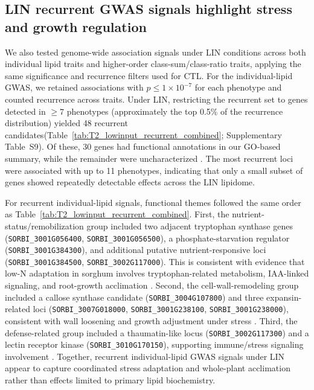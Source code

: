 \documentclass[9pt,twocolumn,twoside]{rilabRxiv}
\begin{document}
\subsection*{LIN recurrent GWAS signals highlight stress and growth regulation}

We also tested genome-wide association signals under LIN conditions across both individual lipid traits and higher-order class-sum/class-ratio traits, applying the same significance and recurrence filters used for CTL. For the individual-lipid GWAS, we retained associations with $p \le 1\times10^{-7}$ for each phenotype and counted recurrence across traits. Under LIN, restricting the recurrent set to genes detected in \(\geq 7\) phenotypes (approximately the top 0.5\% of the recurrence distribution) yielded 48 recurrent candidates(Table~\ref{tab:T2_lowinput_recurrent_combined}; Supplementary Table~S9). Of these, 30 genes had functional annotations in our GO-based summary, while the remainder were uncharacterized \citep{GeneOntologyConsortium2026}. The most recurrent loci were associated with up to 11 phenotypes, indicating that only a small subset of genes showed repeatedly detectable effects across the LIN lipidome.

For recurrent individual-lipid signals, functional themes followed the same order as Table~\ref{tab:T2_lowinput_recurrent_combined}. First, the nutrient-status/remobilization group included two adjacent tryptophan synthase genes (\texttt{SORBI\_3001G056400}, \texttt{SORBI\_3001G056500}), a phosphate-starvation regulator (\texttt{SORBI\_3001G384300}), and additional putative nutrient-responsive loci (\texttt{SORBI\_3001G384500}, \texttt{SORBI\_3002G117000}). This is consistent with evidence that low-N adaptation in sorghum involves tryptophan-related metabolism, IAA-linked signaling, and root-growth acclimation \citep{Liu2024,Fu2022,Wang2025}. Second, the cell-wall-remodeling group included a callose synthase candidate (\texttt{SORBI\_3004G107800}) and three expansin-related loci (\texttt{SORBI\_3007G018000}, \texttt{SORBI\_3001G238100}, \texttt{SORBI\_3001G238000}), consistent with wall loosening and growth adjustment under stress \citep{Gladman2022SorghumBase,CuiLee2016,McQueenMason1992,Cosgrove2024,Wang2024Expansin}. Third, the defense-related group included a thaumatin-like locus (\texttt{SORBI\_3002G117300}) and a lectin receptor kinase (\texttt{SORBI\_3010G170150}), supporting immune/stress signaling involvement \citep{Gladman2022SorghumBase, Wang2015LecRKIX}. Together, recurrent individual-lipid GWAS signals under LIN appear to capture coordinated stress adaptation and whole-plant acclimation rather than effects limited to primary lipid biochemistry.
\end{document}
